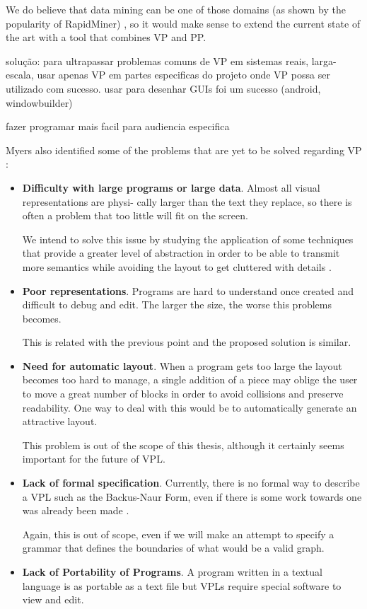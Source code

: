 \begin{itemsize}
We do believe that
data mining can be one of those domains (as shown by the popularity of RapidMiner) \cite{kdn},
so it would make sense to extend the current state of the art with a tool that
combines VP and PP.

solução: para ultrapassar problemas comuns de VP em sistemas reais, larga-escala,
usar apenas VP em partes especificas do projeto onde VP possa ser utilizado com
sucesso. usar para desenhar GUIs foi um sucesso (android, windowbuilder)

fazer programar mais facil para audiencia especifica
\cite{Burnett1999}

Myers also identified some of the problems that are yet to be solved
regarding VP \cite{Myers1990}:

\begin{itemize}
  \item \textbf{Difficulty with large programs or large data}. Almost all visual representations are physi-
cally larger than the text they replace, so there is often a problem that too little will fit on
the screen.

We intend to solve this issue by studying the application of some techniques
that provide a greater level of abstraction in order to be able to transmit
more semantics while avoiding the layout to get cluttered with details \cite{Burnett1995}.
  \item \textbf{Poor representations}. Programs are hard to understand once created and
difficult to debug and edit. The larger the size, the worse this problems becomes.

This is related with the previous point and the proposed solution is similar.
  \item \textbf{Need for automatic layout}. When a program gets too large the layout
becomes too hard to manage, a single addition of a piece may oblige the user
to move a great number of blocks in order to avoid collisions and preserve
readability. One way to deal with this would be to automatically generate an
attractive layout.

This problem is out of the scope of this thesis, although
it certainly seems important for the future of VPL.
  \item \textbf{Lack of formal specification}. Currently, there is no formal way to describe
a VPL such as the Backus-Naur Form, even if there is some work towards one was
already been made \cite{selker1988elements}.

Again, this is out of scope, even
if we will make an attempt to specify a grammar that defines the boundaries of
what would be a valid graph.
  \item \textbf{Lack of Portability of Programs}. A program written in a textual language
is as portable as a text file but VPLs require special software to view and edit.


\end{itemize}
\end{itemsize}
